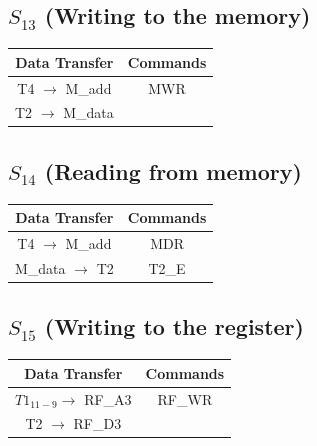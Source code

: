 \documentclass[]{report}
\begin{document}
        \subsection*{$S_{13}$ (Writing to the memory)} %
        \begin{center}
            \begin{tabular}{|c|c|}
                \hline
                Data Transfer & Commands \\
                \hline
                T4 $\to$ M\_add & MWR\\
                T2 $\to$ M\_data & \\
                \hline
            \end{tabular}
        \end{center}
        \subsection*{$S_{14}$ (Reading from memory)} %
        \begin{center}
            \begin{tabular}{|c|c|}
                \hline
                Data Transfer & Commands \\
                \hline
                T4 $\to$ M\_add & MDR\\
                M\_data $\to$ T2 & T2\_E\\
                \hline
            \end{tabular}
        \end{center}
        \subsection*{$S_{15}$ (Writing to the register)} %
            \begin{center}
                \begin{tabular}{|c|c|}
                    \hline
                    Data Transfer & Commands \\
                    \hline
                    $T1_{11-9} \to$ RF\_A3 & RF\_WR\\
                    T2 $\to$ RF\_D3 & \\
                    \hline
                \end{tabular}
            \end{center}
\end{document}
